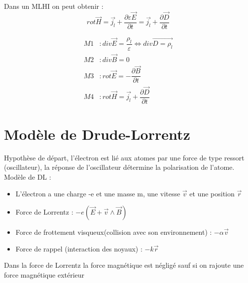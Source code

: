 \documentclass[12pt,a4paper]{report}
\begin{document}
Dans un MLHI on peut obtenir : 
\[
	rot \vec{H} = \vec{j_l} + \dfrac{\partial \varepsilon \vec{E}}{\partial t} = \vec{j_l} + \dfrac{\partial \vec{D}}{\partial t}
\]

\begin{align*}
	M1 &: div \vec{E} = \dfrac{\rho_l}{\varepsilon} \Leftrightarrow div \vec{D = \rho_l}\\
	M2 &: div \vec{B} = 0\\
	M3 &:  rot \vec{E} = - \dfrac{\partial \vec{B}}{\partial t}\\
	M4 &: rot \vec{H} = \vec{j_l} + \dfrac{\partial \vec{D}}{\partial t}
\end{align*}

\section{Modèle de Drude-Lorrentz}

Hypothèse de départ, l'électron est lié aux atomes par une force de type ressort (oscillateur), la réponse de l'oscillateur détermine la polarisation de l'atome.\\
Modèle de DL :

\begin{itemize}
	\item L'électron a une charge -e et une masse m, une vitesse \(\vec{v}\) et une position \(\vec{r}\)
	\item Force de Lorrentz : \(-e (\vec{E} + \vec{v} \wedge \vec{B})\)
	\item Force de frottement visqueux(collision avec son environnement) : \(- \alpha \vec{v}\)
	\item Force de rappel (interaction des noyaux) : \(- k \vec{r}\)
\end{itemize}

Dans la force de Lorrentz la force magnétique est négligé sauf si on rajoute une force magnétique extérieur
\end{document}
